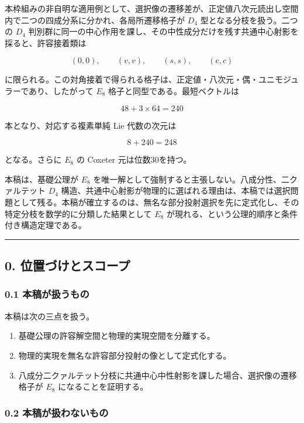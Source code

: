 \documentclass[
  a4paper,
  ja=minimal,
  xelatex,
  paragraph-mark={},
]{bxjsarticle}
\providecommand{\tightlist}{%
  \setlength{\itemsep}{0pt}\setlength{\parskip}{0pt}}
\begin{document}
本枠組みの非自明な適用例として、選択像の遷移差が、正定値八次元読出し空間内で二つの四成分系に分かれ、各局所遷移格子が
\(D_4\) 型となる分枝を扱う。二つの \(D_4\)
判別群に同一の中心作用を課し、その中性成分だけを残す共通中心射影を採ると、許容接着類は

\[
(0,0),\qquad(v,v),\qquad(s,s),\qquad(c,c)
\]

に限られる。この対角接着で得られる格子は、正定値・八次元・偶・ユニモジュラーであり、したがって
\(E_8\) 格子と同型である。最短ベクトルは

\[
48+3\times64=240
\]

本となり、対応する複素単純 Lie 代数の次元は

\[
8+240=248
\]

となる。さらに \(E_8\) の Coxeter 元は位数30を持つ。

本稿は、基礎公理が \(E_8\)
を唯一解として強制すると主張しない。八成分性、二クァルテット \(D_4\)
構造、共通中心射影が物理的に選ばれる理由は、本稿では選択問題として残る。本稿が確立するのは、無名な部分投射選択を先に定式化し、その特定分枝を数学的に分類した結果として
\(E_8\) が現れる、という公理的順序と条件付き構造定理である。

\begin{center}\rule{0.5\linewidth}{0.5pt}\end{center}

\subsection{0.
位置づけとスコープ}\label{ux4f4dux7f6eux3065ux3051ux3068ux30b9ux30b3ux30fcux30d7}

\subsubsection{0.1
本稿が扱うもの}\label{ux672cux7a3fux304cux6271ux3046ux3082ux306e}

本稿は次の三点を扱う。

\begin{enumerate}
\def\labelenumi{\arabic{enumi}.}
\tightlist
\item
  基礎公理の許容解空間と物理的実現空間を分離する。
\item
  物理的実現を無名な許容部分投射の像として定式化する。
\item
  八成分二クァルテット分枝に共通中心中性射影を課した場合、選択像の遷移格子が
  \(E_8\) になることを証明する。
\end{enumerate}

\subsubsection{0.2
本稿が扱わないもの}\label{ux672cux7a3fux304cux6271ux308fux306aux3044ux3082ux306e}
\end{document}
